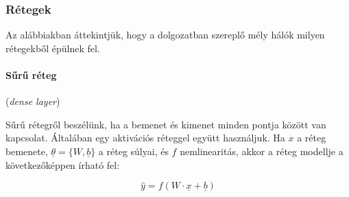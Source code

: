 

\subsubsection{Rétegek}



Az alábbiakban áttekintjük, hogy a dolgozatban szereplő mély hálók milyen rétegekből épülnek fel.


\paragraph{Sűrű réteg} (\textit{dense layer}) 


Sűrű rétegről beszélünk, ha a bemenet és kimenet minden pontja között van kapcsolat. Általában egy aktivációs réteggel együtt használjuk. Ha $ x $ a réteg bemenete, $ \underline{\theta} = \{W, \underline{b}\} $ a réteg súlyai, és $ f $ nemlinearitás, akkor a réteg modellje a következőképpen írható fel:


\[  
\hat{y} = f(W \cdot \underline{x} + \underline{b})
\]


